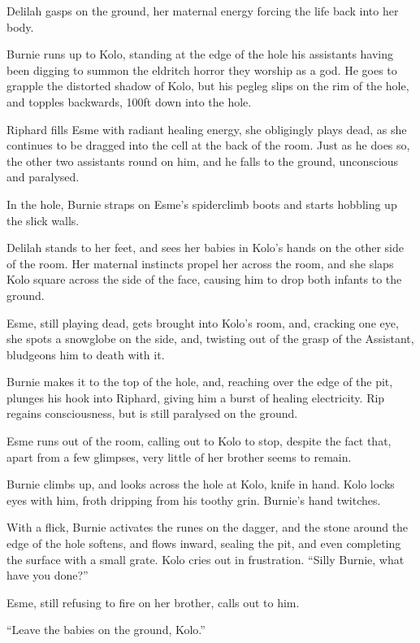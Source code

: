 Delilah gasps on the ground, her maternal energy forcing the life back into her body.\medskip

Burnie runs up to Kolo, standing at the edge of the hole his assistants having been digging to summon the eldritch horror they worship as a god. He goes to grapple the distorted shadow of Kolo, but his pegleg slips on the rim of the hole, and topples backwards, 100ft down into the hole.\medskip

Riphard fills Esme with radiant healing energy, she obligingly plays dead, as she continues to be dragged into the cell at the back of the room. Just as he does so, the other two assistants round on him, and he falls to the ground, unconscious and paralysed.\medskip

In the hole, Burnie straps on Esme’s spiderclimb boots and starts hobbling up the slick walls.\medskip

Delilah stands to her feet, and sees her babies in Kolo’s hands on the other side of the room. Her maternal instincts propel her across the room, and she slaps Kolo square across the side of the face, causing him to drop both infants to the ground.\medskip

Esme, still playing dead, gets brought into Kolo’s room, and, cracking one eye, she spots a snowglobe on the side, and, twisting out of the grasp of the Assistant, bludgeons him to death with it.\medskip

Burnie makes it to the top of the hole, and, reaching over the edge of the pit, plunges his hook into Riphard, giving him a burst of healing electricity. Rip regains consciousness, but is still paralysed on the ground.\medskip

Esme runs out of the room, calling out to Kolo to stop, despite the fact that, apart from a few glimpses, very little of her brother seems to remain.\medskip

Burnie climbs up, and looks across the hole at Kolo, knife in hand. Kolo locks eyes with him, froth dripping from his toothy grin. Burnie’s hand twitches.\medskip

With a flick, Burnie activates the runes on the dagger, and the stone around the edge of the hole softens, and flows inward, sealing the pit, and even completing the surface with a small grate. Kolo cries out in frustration. “Silly Burnie, what have you done?”\medskip

Esme, still refusing to fire on her brother, calls out to him.\medskip

“Leave the babies on the ground, Kolo.”\medskip

